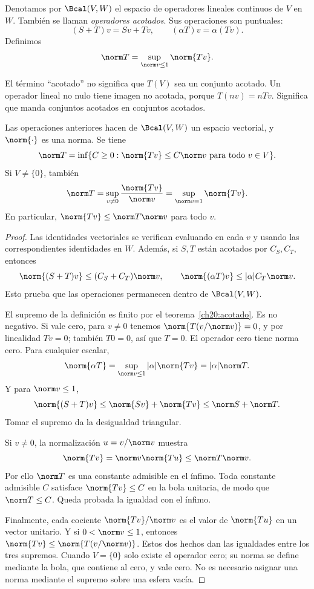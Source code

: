 \begin{definicion}
Denotamos por $\Bcal(V,W)$ el espacio de operadores lineales continuos de $V$ en $W$. También se llaman \emph{operadores acotados}. Sus operaciones son puntuales:
\[
 (S+T)v=Sv+Tv,\qquad (\alpha T)v=\alpha(Tv).
\]
Definimos
\[
 \norm T=\sup_{\norm v\leq1}\norm{Tv}.
\]
\end{definicion}

El término ``acotado'' no significa que $T(V)$ sea un conjunto acotado. Un operador lineal no nulo tiene imagen no acotada, porque $T(nv)=nTv$. Significa que manda conjuntos acotados en conjuntos acotados.

\begin{proposicion}\label{ch20:norma}
Las operaciones anteriores hacen de $\Bcal(V,W)$ un espacio vectorial, y $\norm{\cdot}$ es una norma. Se tiene
\[
 \norm T=\inf\{C\geq0:\norm{Tv}\leq C\norm v\text{ para todo }v\in V\}.
\]
Si $V\ne\{0\}$, también
\[
 \norm T=\sup_{v\ne0}\frac{\norm{Tv}}{\norm v}
 =\sup_{\norm v=1}\norm{Tv}.
\]
En particular, $\norm{Tv}\leq\norm T\norm v$ para todo $v$.
\end{proposicion}
\begin{proof}
Las identidades vectoriales se verifican evaluando en cada $v$ y usando las correspondientes identidades en $W$. Además, si $S,T$ están acotados por $C_S,C_T$, entonces
\[
 \norm{(S+T)v}\leq(C_S+C_T)\norm v,
 \qquad\norm{(\alpha T)v}\leq|\alpha|C_T\norm v.
\]
Esto prueba que las operaciones permanecen dentro de $\Bcal(V,W)$.

El supremo de la definición es finito por el teorema~\ref{ch20:acotado}. Es no negativo. Si vale cero, para $v\ne0$ tenemos $\norm{T(v/\norm v)}=0$, y por linealidad $Tv=0$; también $T0=0$, así que $T=0$. El operador cero tiene norma cero. Para cualquier escalar,
\[
 \norm{\alpha T}=\sup_{\norm v\leq1}|\alpha|\norm{Tv}=|\alpha|\norm T.
\]
Y para $\norm v\leq1$,
\[
 \norm{(S+T)v}\leq\norm{Sv}+\norm{Tv}\leq\norm S+\norm T.
\]
Tomar el supremo da la desigualdad triangular.

Si $v\ne0$, la normalización $u=v/\norm v$ muestra
\[
 \norm{Tv}=\norm v\norm{Tu}\leq\norm T\norm v.
\]
Por ello $\norm T$ es una constante admisible en el ínfimo. Toda constante admisible $C$ satisface $\norm{Tv}\leq C$ en la bola unitaria, de modo que $\norm T\leq C$. Queda probada la igualdad con el ínfimo.

Finalmente, cada cociente $\norm{Tv}/\norm v$ es el valor de $\norm{Tu}$ en un vector unitario. Y si $0<\norm v\leq1$, entonces $\norm{Tv}\leq\norm{T(v/\norm v)}$. Estos dos hechos dan las igualdades entre los tres supremos. Cuando $V=\{0\}$ solo existe el operador cero; su norma se define mediante la bola, que contiene al cero, y vale cero. No es necesario asignar una norma mediante el supremo sobre una esfera vacía.
\end{proof}

